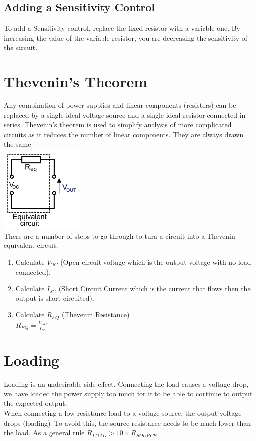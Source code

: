 \documentclass[a4paper,11pt, twocolumn]{article}
\begin{document}
\subsection{Adding a Sensitivity Control}
To add a Sensitivity control, replace the fixed resistor with a variable one. By increasing the value of the variable resistor, you are decreasing the sensitivity of the circuit.

\section{Thevenin's Theorem}
Any combination of power supplies and linear components (resistors) can be replaced by a single ideal voltage source and a single ideal resistor connected in series. Thevenin's theorem is used to simplify analysis of more complicated circuits as it reduces the number of linear components. They are always drawn the same\\
\includegraphics[width=0.3\textwidth]{thevenin.jpg}\\
There are a number of steps to go through to turn a circuit into a Thevenin equivalent circuit.
\begin{enumerate}
    \item Calculate $V_{OC}$ (Open circuit voltage which is the output voltage with no load connected).
    \item Calculate $I_{SC}$ (Short Circuit Current which is the current that flows then the output is short circuited).
    \item Calculate $R_{EQ}$ (Thevenin Resistance)\\ $\displaystyle R_{EQ} = \frac{V_{OC}}{I_{SC}}$
\end{enumerate}

\section{Loading}
Loading is an undesirable side effect. Connecting the load causes a voltage drop, we have loaded the power supply too much for it to be able to continue to output the expected output.\\
When connecting a low resistance load to a voltage source, the output voltage drops (loading). To avoid this, the source resistance needs to be much lower than the load. As a general rule $R_{LOAD} > 10 \times R_{SOURCE}$.

\end{document}
